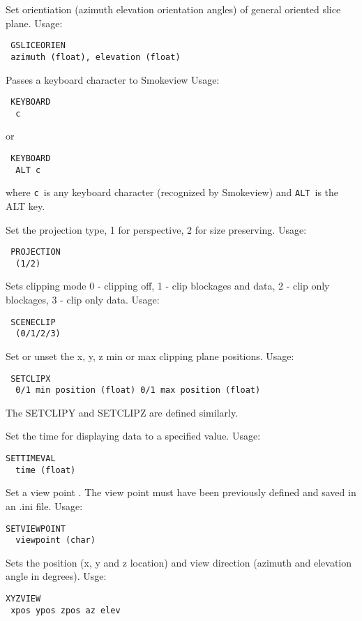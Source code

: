\documentclass[11pt,twoside]{book}
\begin{document}
Set orientiation (azimuth elevation orientation angles) of general oriented slice plane.
Usage:
\begin{lstlisting}
 GSLICEORIEN
 azimuth (float), elevation (float)
\end{lstlisting}

Passes a keyboard character to Smokeview
Usage:
\begin{lstlisting}
 KEYBOARD
  c
\end{lstlisting}
or
\begin{lstlisting}
 KEYBOARD
  ALT c
\end{lstlisting}
where {\tt c}\ is any keyboard character (recognized by Smokeview) and {\tt ALT}\ is the ALT key.

Set the projection type, 1 for perspective, 2 for size preserving.
Usage:
\begin{lstlisting}
 PROJECTION
  (1/2)
\end{lstlisting}

Sets clipping mode 0 - clipping off, 1 - clip blockages and data,
2 - clip only blockages, 3 - clip only data.
Usage:
\begin{lstlisting}
 SCENECLIP
  (0/1/2/3)
\end{lstlisting}


Set or unset the x, y, z min or max clipping plane positions.
Usage:
\begin{lstlisting}
 SETCLIPX
  0/1 min position (float) 0/1 max position (float)
\end{lstlisting}
The SETCLIPY and SETCLIPZ are defined similarly.

Set the time for displaying data to a specified value.
Usage:
\begin{lstlisting}
SETTIMEVAL
  time (float)
\end{lstlisting}

Set a view point .  The view point must have been previously defined and
saved in an .ini file.
Usage:
\begin{lstlisting}
SETVIEWPOINT
  viewpoint (char)
\end{lstlisting}

Sets the position (x, y and z location) and view direction (azimuth and elevation angle in degrees).
Usge:
\begin{lstlisting}
XYZVIEW
 xpos ypos zpos az elev
\end{lstlisting}
\end{document}
